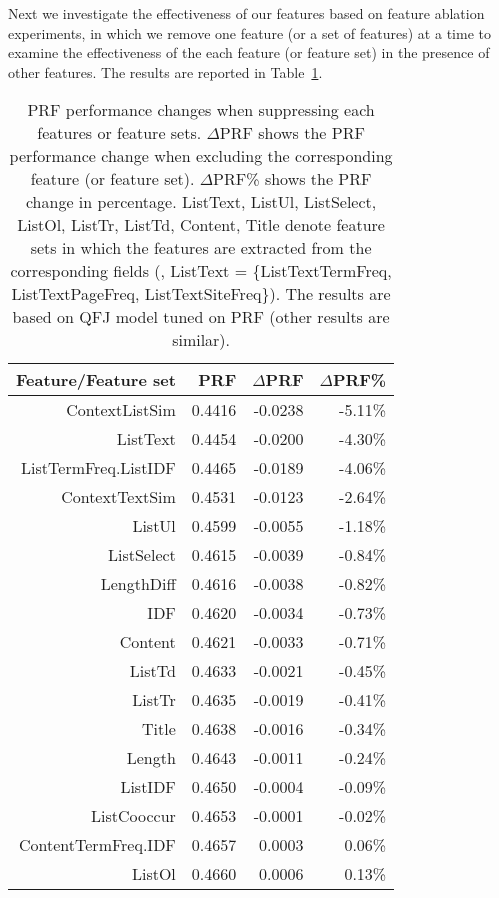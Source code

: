 Next we investigate the effectiveness of our features based on feature ablation experiments, in which we remove one feature (or a set of features) at a time to examine the effectiveness of the each feature (or feature set) in the presence of other features. The results are reported in Table~\ref{tab:intrinsic-ablation}.
\begin{table}[H]
\centering
\caption{PRF performance changes when suppressing each features or feature sets. $\Delta$PRF shows the PRF performance change when excluding the corresponding feature (or feature set). $\Delta$PRF\% shows the PRF change in percentage. ListText, ListUl, ListSelect, ListOl, ListTr, ListTd, Content, Title denote feature sets in which the features are extracted from the corresponding fields (\eg, ListText = \{ListTextTermFreq, ListTextPageFreq, ListTextSiteFreq\}). 
The results are based on QFJ model tuned on PRF (other results are similar).}
\label{tab:intrinsic-ablation}
\begin{tabular}{|r|r|r|r|} \hline
Feature/Feature set & PRF & $\Delta$PRF & $\Delta$PRF\% \\ \hline
ContextListSim & 0.4416 & -0.0238 & -5.11\% \\ \hline
ListText & 0.4454 & -0.0200 & -4.30\% \\ \hline
ListTermFreq.ListIDF & 0.4465 & -0.0189 & -4.06\% \\ \hline
ContextTextSim & 0.4531 & -0.0123 & -2.64\% \\ \hline
ListUl & 0.4599 & -0.0055 & -1.18\% \\ \hline
ListSelect & 0.4615 & -0.0039 & -0.84\% \\ \hline
LengthDiff & 0.4616 & -0.0038 & -0.82\% \\ \hline
IDF & 0.4620 & -0.0034 & -0.73\% \\ \hline
Content & 0.4621 & -0.0033 & -0.71\% \\ \hline
ListTd & 0.4633 & -0.0021 & -0.45\% \\ \hline
ListTr & 0.4635 & -0.0019 & -0.41\% \\ \hline
Title & 0.4638 & -0.0016 & -0.34\% \\ \hline
Length & 0.4643 & -0.0011 & -0.24\% \\ \hline
ListIDF & 0.4650 & -0.0004 & -0.09\% \\ \hline
ListCooccur & 0.4653 & -0.0001 & -0.02\% \\ \hline
ContentTermFreq.IDF & 0.4657 & 0.0003 & 0.06\% \\ \hline
ListOl & 0.4660 & 0.0006 & 0.13\% \\ \hline
\end{tabular}
\end{table}

